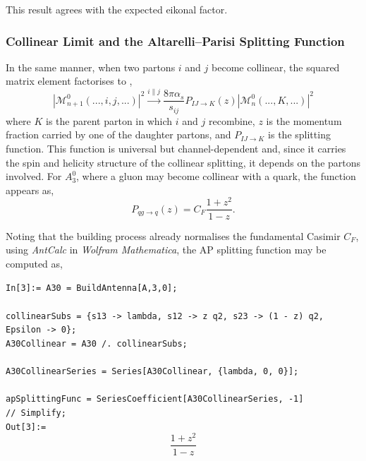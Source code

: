 This result agrees with the expected eikonal factor.

\subsubsection*{Collinear Limit and the Altarelli--Parisi Splitting Function}

In the same manner, when two partons $i$ and $j$ become collinear, the squared matrix element
factorises to \cite{Catani:1996vz,Altarelli:1977zs},
\begin{equation}
    |\mathcal M_{n+1}^0(...,i,j,...)|^2\xrightarrow{i\parallel j}\frac{8\pi\alpha_s}{s_{ij}}P_{IJ\to K}(z)|\mathcal M_n^0(...,K,...)|^2
\end{equation}
where $K$ is the parent parton in which $i$ and $j$ recombine, $z$ is the momentum fraction 
carried by one of the daughter partons, and $P_{IJ\to K}$ is the splitting function. This function
is universal but channel-dependent and, since it carries the spin and helicity 
structure of the collinear 
splitting, it depends on the partons involved. For $A_3^0$, where a gluon may become 
collinear with a quark, the function appears as,
\begin{equation}
    P_{qg\to q}(z) = C_F\frac{1+z^2}{1-z}.
\end{equation}

Noting that the building process already normalises the fundamental Casimir $C_F$, using 
\textit{AntCalc} in \textit{Wolfram Mathematica}, the AP splitting function may be 
computed as,

\begin{mdframed}[backgroundcolor=gray!10, linewidth=0pt]
    \texttt{In[3]:= A30 = BuildAntenna[A,3,0];\\
                    \\
                    collinearSubs = \{s13 -> lambda, s12 -> z q2, s23 -> (1 - z) q2, \\Epsilon
                     -> 0\};\\
                    A30Collinear = A30 /. collinearSubs;\\
                    \\
                    A30CollinearSeries = Series[A30Collinear, \{lambda, 0, 0\}];\\
                    \\
                    apSplittingFunc = SeriesCoefficient[A30CollinearSeries, -1]\\ 
                    // Simplify;}\\
    \hfill
    \texttt{Out[3]:=}
        \begin{equation*}
            \frac{1+z^2}{1-z}
        \end{equation*}
\end{mdframed}

